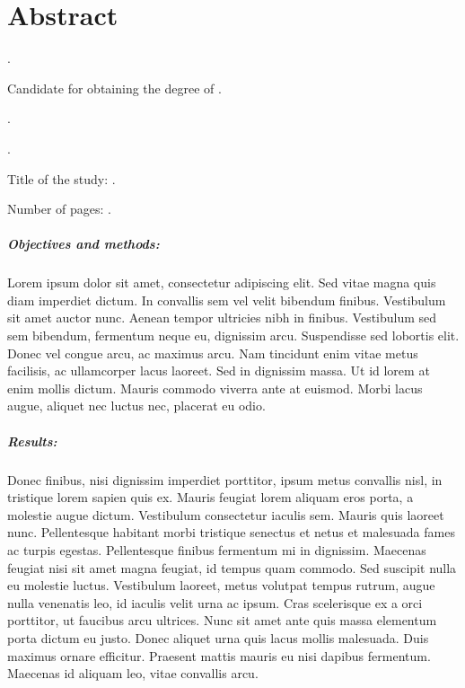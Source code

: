 
\chapter{Abstract}

{\setlength{\leftskip}{10mm}
\setlength{\parindent}{-10mm}

\autoren.

Candidate for obtaining the degree of \gradoen\orientacionen.

\uanl.

\fime.

Title of the study: \textsc{\tituloen}.

\noindent Number of pages: \pageref*{lastpage}.}

\paragraph{Objectives and methods:}
Lorem ipsum dolor sit amet, consectetur adipiscing elit. Sed vitae magna quis diam imperdiet dictum. In convallis sem vel velit bibendum finibus. Vestibulum sit amet auctor nunc. Aenean tempor ultricies nibh in finibus. Vestibulum sed sem bibendum, fermentum neque eu, dignissim arcu. Suspendisse sed lobortis elit. Donec vel congue arcu, ac maximus arcu. Nam tincidunt enim vitae metus facilisis, ac ullamcorper lacus laoreet. Sed in dignissim massa. Ut id lorem at enim mollis dictum. Mauris commodo viverra ante at euismod. Morbi lacus augue, aliquet nec luctus nec, placerat eu odio.


\paragraph{Results:}
Donec finibus, nisi dignissim imperdiet porttitor, ipsum metus convallis nisl, in tristique lorem sapien quis ex. Mauris feugiat lorem aliquam eros porta, a molestie augue dictum. Vestibulum consectetur iaculis sem. Mauris quis laoreet nunc. Pellentesque habitant morbi tristique senectus et netus et malesuada fames ac turpis egestas. Pellentesque finibus fermentum mi in dignissim. Maecenas feugiat nisi sit amet magna feugiat, id tempus quam commodo. Sed suscipit nulla eu molestie luctus. Vestibulum laoreet, metus volutpat tempus rutrum, augue nulla venenatis leo, id iaculis velit urna ac ipsum. Cras scelerisque ex a orci porttitor, ut faucibus arcu ultrices. Nunc sit amet ante quis massa elementum porta dictum eu justo. Donec aliquet urna quis lacus mollis malesuada. Duis maximus ornare efficitur. Praesent mattis mauris eu nisi dapibus fermentum. Maecenas id aliquam leo, vitae convallis arcu.


